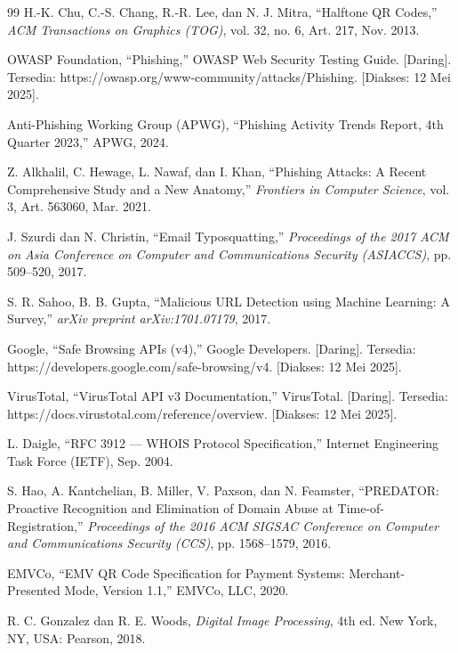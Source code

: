 \documentclass[conference]{IEEEtran}
\begin{document}
\begin{thebibliography}{99}
H.-K. Chu, C.-S. Chang, R.-R. Lee, dan N. J. Mitra, ``Halftone QR Codes,'' \textit{ACM Transactions on Graphics (TOG)}, vol. 32, no. 6, Art. 217, Nov. 2013.

OWASP Foundation, ``Phishing,'' OWASP Web Security Testing Guide. [Daring]. Tersedia: https://owasp.org/www-community/attacks/Phishing. [Diakses: 12 Mei 2025].

Anti-Phishing Working Group (APWG), ``Phishing Activity Trends Report, 4th Quarter 2023,'' APWG, 2024.

Z. Alkhalil, C. Hewage, L. Nawaf, dan I. Khan, ``Phishing Attacks: A Recent Comprehensive Study and a New Anatomy,'' \textit{Frontiers in Computer Science}, vol. 3, Art. 563060, Mar. 2021.

J. Szurdi dan N. Christin, ``Email Typosquatting,'' \textit{Proceedings of the 2017 ACM on Asia Conference on Computer and Communications Security (ASIACCS)}, pp. 509--520, 2017.

S. R. Sahoo, B. B. Gupta, ``Malicious URL Detection using Machine Learning: A Survey,'' \textit{arXiv preprint arXiv:1701.07179}, 2017.

Google, ``Safe Browsing APIs (v4),'' Google Developers. [Daring]. Tersedia: https://developers.google.com/safe-browsing/v4. [Diakses: 12 Mei 2025].

VirusTotal, ``VirusTotal API v3 Documentation,'' VirusTotal. [Daring]. Tersedia: https://docs.virustotal.com/reference/overview. [Diakses: 12 Mei 2025].

L. Daigle, ``RFC 3912 --- WHOIS Protocol Specification,'' Internet Engineering Task Force (IETF), Sep. 2004.

S. Hao, A. Kantchelian, B. Miller, V. Paxson, dan N. Feamster, ``PREDATOR: Proactive Recognition and Elimination of Domain Abuse at Time-of-Registration,'' \textit{Proceedings of the 2016 ACM SIGSAC Conference on Computer and Communications Security (CCS)}, pp. 1568--1579, 2016.

EMVCo, ``EMV QR Code Specification for Payment Systems: Merchant-Presented Mode, Version 1.1,'' EMVCo, LLC, 2020.

R. C. Gonzalez dan R. E. Woods, \textit{Digital Image Processing}, 4th ed. New York, NY, USA: Pearson, 2018.


\end{thebibliography}
\end{document}
